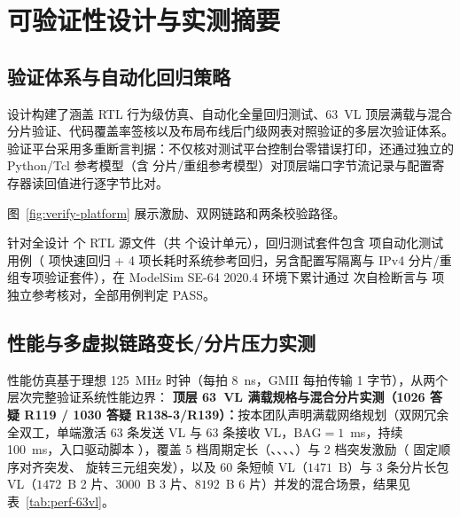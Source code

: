 \chapter{可验证性设计与实测摘要}\label{ch:verif}

\section{验证体系与自动化回归策略}\label{sec:verifstrat}

设计构建了涵盖 RTL 行为级仿真、自动化全量回归测试、63~VL 顶层满载与混合分片验证、代码覆盖率签核以及布局布线后门级网表对照验证的多层次验证体系。验证平台采用多重断言判据：不仅核对测试平台控制台零错误打印，还通过独立的 Python/Tcl 参考模型（含  分片/重组参考模型）对顶层端口字节流记录与配置寄存器读回值进行逐字节比对。

图~\ref{fig:verify-platform} 展示激励、双网链路和两条校验路径。


针对全设计 \RtlFileCount{} 个 RTL 源文件（共 \DesignUnitCount{} 个设计单元），回归测试套件包含 \RegCount{} 项自动化测试用例（\RegFastCount{} 项快速回归 + 4 项长耗时系统参考回归，另含配置写隔离与 IPv4 分片/重组专项验证套件），在 ModelSim SE-64 2020.4 环境下累计通过 \countsep{\RegChecks} 次自检断言与 \countsep{\RegIndep} 项独立参考核对，全部用例判定 PASS。

\section{性能与多虚拟链路变长/分片压力实测}\label{sec:perfmeas}

性能仿真基于理想 125~MHz 时钟（每拍 8~ns，GMII 每拍传输 1 字节），从两个层次完整验证系统性能边界：
\textbf{顶层  63~VL 满载规格与混合分片实测（1026 答疑 R119 / 1030 答疑 R138-3/R139）：}按本团队声明满载网络规划（双网冗余全双工，单端激活 63 条发送 VL 与 63 条接收 VL，$\text{BAG}=1$~ms，持续 100~ms，入口驱动脚本 ），覆盖 5 档周期定长（、、、、）与 2 档突发激励（ 固定顺序对齐突发、 旋转三元组突发），以及 60 条短帧 VL（$1471$~B）与 3 条分片长包 VL（$1472$~B 2 片、$3000$~B 3 片、$8192$~B 6 片）并发的混合场景，结果见表~\ref{tab:perf-63vl}。

